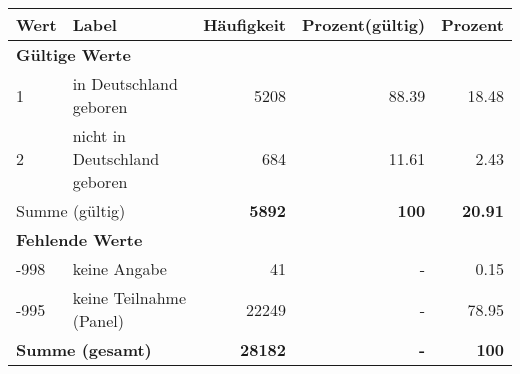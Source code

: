      \begin{longtable}{lXrrr}
     \toprule
     \textbf{Wert} & \textbf{Label} & \textbf{Häufigkeit} & \textbf{Prozent(gültig)} & \textbf{Prozent} \\
     \endhead
     \midrule
     \multicolumn{5}{l}{\textbf{Gültige Werte}}\\

     1 &
     \multicolumn{1}{X}{ in Deutschland geboren   } &


       \num{5208} &
       \num[round-mode=places,round-precision=2]{88.39} &
         \num[round-mode=places,round-precision=2]{18.48} \\

     2 &
     \multicolumn{1}{X}{ nicht in Deutschland geboren   } &


       \num{684} &
       \num[round-mode=places,round-precision=2]{11.61} &
         \num[round-mode=places,round-precision=2]{2.43} \\
     \midrule
     \multicolumn{2}{l}{Summe (gültig)} &
       \textbf{\num{5892}} &
     \textbf{100} &
       \textbf{\num[round-mode=places,round-precision=2]{20.91}} \\
     \multicolumn{5}{l}{\textbf{Fehlende Werte}}\\
       -998 &
       keine Angabe &
         \num{41} &
        - &
         \num[round-mode=places,round-precision=2]{0.15} \\
       -995 &
       keine Teilnahme (Panel) &
         \num{22249} &
        - &
         \num[round-mode=places,round-precision=2]{78.95} \\
     \midrule
     \multicolumn{2}{l}{\textbf{Summe (gesamt)}} &
          \textbf{\num{28182}} &
        \textbf{-} &
        \textbf{100} \\
     \bottomrule
     \end{longtable}
     
